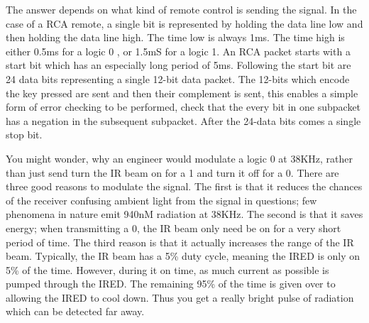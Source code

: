                             The answer depends on what kind of remote control is sending the signal.  In the
                            case of a RCA remote, a single bit is represented by holding the data line low and
                            then holding the data line high.  The time low is always 1ms.  The time high is
                            either 0.5ms for a logic 0 , or 1.5mS for a logic 1.  An RCA packet starts with
                            a start bit which has an especially long period of 5ms.  Following the start
                            bit are 24 data bits representing a single 12-bit data packet.  The 12-bits
                            which encode the key pressed are sent and then their complement is sent, this
                            enables a simple form of error checking to be performed, check that the every
                            bit in one subpacket has a negation in the subsequent subpacket.  After the 24-data
                            bits comes a single stop bit.

                            You might wonder, why an engineer would modulate a logic 0 at 38KHz, rather than
                            just send turn the IR beam on for a 1 and turn it off for a 0.  There are three
                            good reasons to modulate the signal.  The first is that
                            it reduces the chances of the receiver confusing ambient light from the
                            signal in questions; few phenomena in nature emit 940nM radiation at 38KHz. The
                            second is that it saves energy; when transmitting a 0, the IR beam only need be
                            on for a very short period of time.  The third reason is that it actually
                            increases the range of the IR beam.  Typically, the IR beam has a 5\% duty cycle,
                            meaning the IRED is only on 5\% of the time.  However, during it on time,
                            as much current as possible is pumped through the IRED.  The remaining 95\% of
                            the time is given over to allowing the IRED to cool down.  Thus you get a really
                            bright pulse of radiation which can be detected far away.

